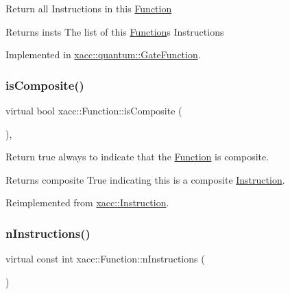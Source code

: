 Return all Instructions in this \hyperlink{a02456}{Function}

\begin{DoxyReturn}{Returns}
insts The list of this \hyperlink{a02456}{Function}\textquotesingle{}s Instructions 
\end{DoxyReturn}


Implemented in \hyperlink{a01272_aebce6a9e64aed7f4aff86df752bacfe2}{xacc\+::quantum\+::\+Gate\+Function}.

\mbox{\label{a02456_aa75500c657b5c3e0e36213e1506aad97}} 
\subsubsection{\texorpdfstring{is\+Composite()}{isComposite()}}
{\footnotesize\ttfamily virtual bool xacc\+::\+Function\+::is\+Composite (\begin{DoxyParamCaption}{ }\end{DoxyParamCaption})\hspace{0.3cm}{\ttfamily [inline]}, {\ttfamily [virtual]}}

Return true always to indicate that the \hyperlink{a02456}{Function} is composite.

\begin{DoxyReturn}{Returns}
composite True indicating this is a composite \hyperlink{a02460}{Instruction}. 
\end{DoxyReturn}


Reimplemented from \hyperlink{a02460_a4383f1036d0fcfe890ab9c613dbd5f38}{xacc\+::\+Instruction}.

\mbox{\label{a02456_a8901985525f59713e14c61713e07c086}} 
\subsubsection{\texorpdfstring{n\+Instructions()}{nInstructions()}}
{\footnotesize\ttfamily virtual const int xacc\+::\+Function\+::n\+Instructions (\begin{DoxyParamCaption}{ }\end{DoxyParamCaption})\hspace{0.3cm}{\ttfamily [pure virtual]}}

